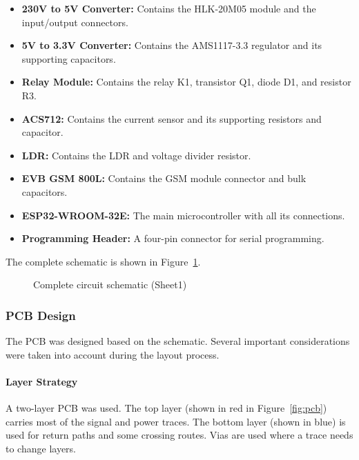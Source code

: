 \documentclass{article}
\begin{document}
\begin{itemize}
    \item \textbf{230V to 5V Converter:} Contains the HLK-20M05 module and the input/output connectors.
    \item \textbf{5V to 3.3V Converter:} Contains the AMS1117-3.3 regulator and its supporting capacitors.
    \item \textbf{Relay Module:} Contains the relay K1, transistor Q1, diode D1, and resistor R3.
    \item \textbf{ACS712:} Contains the current sensor and its supporting resistors and capacitor.
    \item \textbf{LDR:} Contains the LDR and voltage divider resistor.
    \item \textbf{EVB GSM 800L:} Contains the GSM module connector and bulk capacitors.
    \item \textbf{ESP32-WROOM-32E:} The main microcontroller with all its connections.
    \item \textbf{Programming Header:} A four-pin connector for serial programming.
\end{itemize}

The complete schematic is shown in Figure~\ref{fig:schematic}.

\begin{figure}[H]
    \centering
    \caption{Complete circuit schematic (Sheet1)}
    \label{fig:schematic}
\end{figure}

\subsubsection{PCB Design}

The PCB was designed based on the schematic. Several important considerations were taken into account during the layout process.

\paragraph{Layer Strategy}

A two-layer PCB was used. The top layer (shown in red in Figure~\ref{fig:pcb}) carries most of the signal and power traces. The bottom layer (shown in blue) is used for return paths and some crossing routes. Vias are used where a trace needs to change layers.
\end{document}
